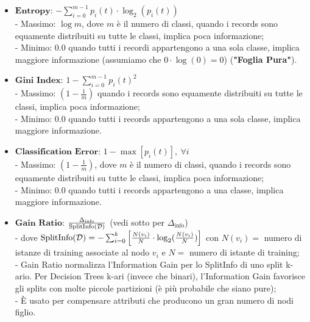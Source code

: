     \begin{itemize}
        \item $\textbf{Entropy}$: $-\sum_{i = 0}^{m-1}{p_{i}(t) \cdot \log_{2}{(p_{i}(t))}}$
            \\[0.5\baselineskip]
            - Massimo: $\log m$, dove $m$ è il numero di classi, quando i records sono equamente distribuiti su tutte le classi, implica poca informazione;
            \\[0.5\baselineskip]
            - Minimo: 0.0 quando tutti i recordi appartengono a una sola classe, implica maggiore informazione (assumiamo che $0 \cdot \log(0) = 0$) (\textbf{"Foglia Pura"}).
            \\
        \item $\textbf{Gini Index}$: $1 - \sum_{i = 0}^{m-1}{p_{i}(t)^{2}}$
            \\[0.5\baselineskip]
            - Massimo: $(1 - \frac{1}{m})$ quando i records sono equamente distribuiti su tutte le classi, implica poca informazione;
            \\[0.5\baselineskip]
            - Minimo: 0.0 quando tutti i records appartengono a una sola classe, implica maggiore informazione.
            \\
        \item $\textbf{Classification Error}$: $1 - \max{[p_{i}(t)]},\ \forall{i}$
            \\[0.5\baselineskip]
            - Massimo: $(1 - \frac{1}{m})$, dove $m$ è il numero di classi, quando i records sono equamente distribuiti su tutte le classi, implica poca informazione;
            \\[0.5\baselineskip]
            - Minimo: 0.0 quando tutti i records appartengono a una classe, implica maggiore informazione.
            \\
        \item $\textbf{Gain Ratio}$: $\frac{\Delta_{\textrm{info}}}{\textrm{SplitInfo}({\cal D})}$ (vedi sotto per $\Delta_{\textrm{info}}$)
            \\[0.5\baselineskip]
            - dove $\textrm{SplitInfo}({\cal D}) = -\sum_{i=0}^{k} {\left[\frac{N(v_{i})}{N} \cdot \log_{2}(\frac{N(v_{i})}{N})\right]}$ con $N(v_{i}) =$ numero di istanze di
                training associate al nodo $v_{i}$ e $N =$ numero di istante di training;
            \\[0.5\baselineskip]
            - Gain Ratio normalizza l'Information Gain per lo SplitInfo di uno split k-ario.
                Per Decision Trees k-ari (invece che binari), l'Information Gain favorisce gli splits con molte piccole partizioni (è più probabile che siano pure);
            \\[0.5\baselineskip]
            - È usato per compensare attributi che producono un gran numero di nodi figlio.
            \\
    \end{itemize}

